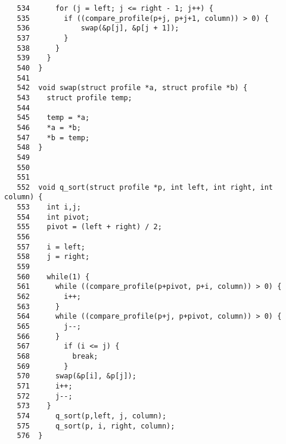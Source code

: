 \documentclass[a4paper,11pt]{jarticle}
\begin{document}
{\begin{verbatim}
   534      for (j = left; j <= right - 1; j++) {
   535        if ((compare_profile(p+j, p+j+1, column)) > 0) {
   536            swap(&p[j], &p[j + 1]);
   537        }
   538      }
   539    }
   540  }
   541  
   542  void swap(struct profile *a, struct profile *b) {
   543    struct profile temp;
   544  
   545    temp = *a;
   546    *a = *b;
   547    *b = temp;
   548  }
   549  
   550  
   551  
   552  void q_sort(struct profile *p, int left, int right, int column) {
   553    int i,j;
   554    int pivot;
   555    pivot = (left + right) / 2;
   556    
   557    i = left;
   558    j = right;
   559  
   560    while(1) {
   561      while ((compare_profile(p+pivot, p+i, column)) > 0) {
   562        i++;
   563      }
   564      while ((compare_profile(p+j, p+pivot, column)) > 0) {
   565        j--;
   566      }
   567        if (i <= j) {
   568          break;
   569        }
   570      swap(&p[i], &p[j]);
   571      i++;
   572      j--;
   573    }
   574      q_sort(p,left, j, column);
   575      q_sort(p, i, right, column);
   576  }

\end{verbatim}
}
 
\end{document}
